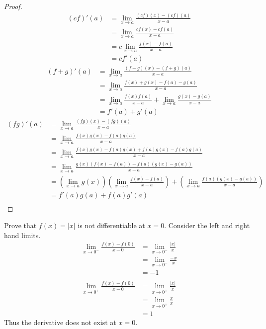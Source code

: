 \documentclass{article}
\begin{document}
\begin{proof}
    \begin{align*}
        (cf)'(a) &= \lim_{x\to a}\frac{(cf)(x) - (cf)(a)}{x-a}\\
        &= \lim_{x\to a}\frac{cf(x) - cf(a)}{x-a}\\
        &= c\lim_{x\to a}\frac{f(x) - f(a)}{x-a}\\
        &= cf'(a)
    \end{align*}
    \begin{align*}
        (f + g)'(a) &= \lim_{x\to a}\frac{(f+g)(x) - (f+g)(a)}{x-a}\\
        &= \lim_{x\to a}\frac{f(x)+g(x) - f(a)-g(a)}{x-a}\\
        &= \lim_{x\to a}\frac{f(x)f(a)}{x-a} + \lim_{x\to a} \frac{g(x) - g(a)}{x-a}\\
        &= f'(a) + g'(a)
    \end{align*}
    \begin{align*}
        (fg)'(a) &= \lim_{x\to a}\frac{(fg)(x) - (fg)(a)}{x-a}\\
        &= \lim_{x\to a}\frac{f(x)g(x) - f(a)g(a)}{x-a}\\
        &= \lim_{x\to a}\frac{f(x)g(x) - f(a)g(x) + f(a)g(x) - f(a)g(a)}{x-a}\\
        &= \lim_{x\to a}\frac{g(x)(f(x) - f(a)) + f(a)(g(x) - g(a))}{x-a}\\
        &= (\lim_{x\to a}g(x))\left(\lim_{x\to a}\frac{f(x)-f(a)}{x-a}\right) + (\lim_{x\to a}\frac{f(a) (g(x) - g(a))}{x-a})\\
        &= f'(a)g(a) + f(a)g'(a)\\
    \end{align*}
\end{proof}
\begin{example}
    Prove that $f(x) = |x|$ is not differentiable at $x=0$. Consider the left and right hand limits. 
    \begin{align*}
        \lim_{x\to 0^-} \frac{f(x) - f(0)}{x-0} &= \lim_{x\to 0^-} \frac{|x|}{x}\\
        &= \lim_{x\to 0^-} \frac{-x}{x}\\
        &= -1\\
        \\
        \lim_{x\to 0^+} \frac{f(x) - f(0)}{x-0} &= \lim_{x\to 0^+} \frac{|x|}{x}\\
        &= \lim_{x\to 0^+} \frac{x}{x}\\
        &= 1
    \end{align*}
    Thus the derivative does not exist at $x=0$.
\end{example}
\end{document}
